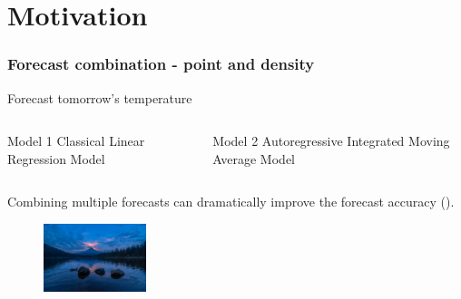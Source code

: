 \section{Motivation}

\logo{}

\begin{frame}
    \frametitle{Forecast combination - point and density}

    Forecast tomorrow's temperature
    
    \begin{columns}[t]
    \begin{column}{0.4\textwidth}
        \begin{exampleblock}{Model 1}
        Classical Linear Regression Model
        \end{exampleblock}
    \end{column}
    
    \begin{column}{0.5\textwidth}
        \begin{exampleblock}{Model 2}
        Autoregressive Integrated Moving Average Model
        \end{exampleblock}
    \end{column}
    \end{columns}

    \vspace{5mm}
    
    Combining multiple forecasts can dramatically improve the forecast accuracy (\cite{BG69}).

\begin{figure}[b]
\centering
\includegraphics[width=3cm]{Graph/Weather.jpg}
\end{figure}

\end{frame}

